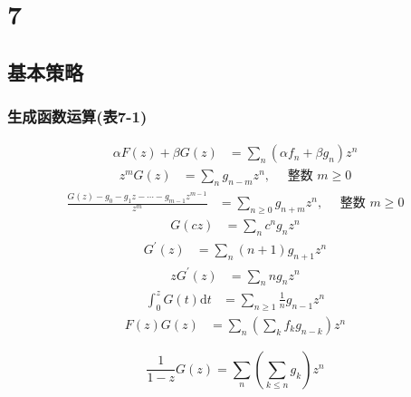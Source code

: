 \setcounter{chapter}{6}
\chapter{7}

\setcounter{section}{1}
\section{基本策略}
\subsection{生成函数运算(表7-1)}
\setcounter{equation}{12}
\begin{align}
    \alpha F(z)+\beta G(z) & =\sum_{n}\left(\alpha f_{n}+\beta g_{n}\right) z^{n}
\end{align}
\begin{align}
    z^mG(z) & =\sum_{n} g_{n-m} z^{n}, \quad \text { 整数 } m \ge 0
\end{align}
\begin{align}
    \frac{G(z)-g_{0}-g_{1} z-\cdots-g_{m-1} z^{m-1}}{z^{m}} & =\sum_{n \ge 0} g_{n+m} z^{n}, \quad \text { 整数 } m \ge 0
\end{align}
\begin{align}
    G(c z) & =\sum_{n} c^{n} g_{n} z^{n}
\end{align}
\begin{align}
    G^{\prime}(z) & =\sum_{n}(n+1) g_{n+1} z^{n}
\end{align}
\begin{align}
    z G^{\prime}(z) & =\sum_{n} n g_{n} z^{n}
\end{align}
\begin{align}
    \int_{0}^{z} G(t) \mathrm{d} t & =\sum_{n \ge 1} \frac{1}{n} g_{n-1} z^{n}
\end{align}
\begin{align}
    F(z) G(z) & =\sum_{n}\left(\sum_{k} f_{k} g_{n-k}\right) z^{n}
\end{align}

\begin{equation}
    \frac{1}{1-z} G(z)=\sum_{n}\left(\sum_{k \leqslant n} g_{k}\right) z^{n}
\end{equation}

